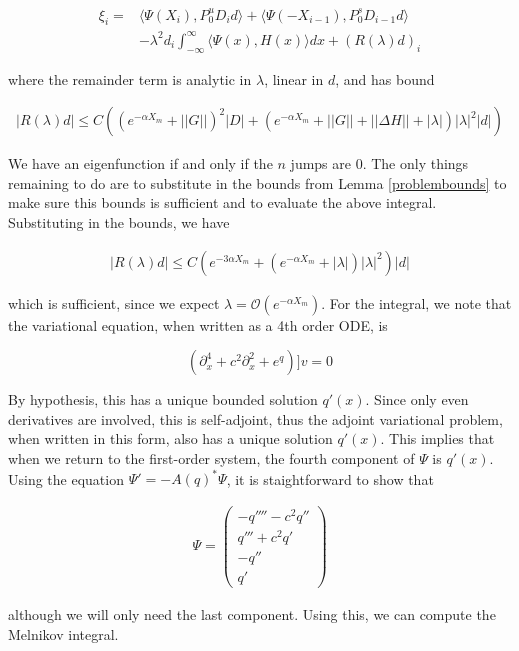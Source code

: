 \documentclass[12pt]{article}
\begin{document}
\begin{align}
\xi_i = &\langle \Psi(X_i), P_0^u D_i d\rangle + \langle \Psi(-X_{i-1}), P_0^s D_{i-1} d\rangle \\
&- \lambda^2 d_i \int_{-\infty}^\infty \langle \Psi(x), H(x) \rangle dx + (R(\lambda)d)_i
\end{align}

where the remainder term is analytic in $\lambda$, linear in $d$, and has bound

\begin{align}
|R(\lambda)d| \leq C( ( e^{-\alpha X_m} + ||G||)^2 |D| 
+ (e^{-\alpha X_m} + ||G|| + ||\Delta H|| + |\lambda|)|\lambda|^2 |d| )
\end{align}

We have an eigenfunction if and only if the $n$ jumps are 0. The only things remaining to do are to substitute in the bounds from Lemma \ref{problembounds} to make sure this bounds is sufficient and to evaluate the above integral. Substituting in the bounds, we have

\begin{align}
|R(\lambda)d| \leq C( e^{-3 \alpha X_m} + ( e^{-\alpha X_m} + |\lambda|)|\lambda|^2 )|d|
\end{align}

which is sufficient, since we expect $\lambda = \mathcal{O}(e^{-\alpha X_m})$. For the integral, we note that the variational equation, when written as a 4th order ODE, is

\[
(\partial_x^4 + c^2 \partial_x^2 + e^{q})]v = 0
\]

By hypothesis, this has a unique bounded solution $q'(x)$. Since only even derivatives are involved, this is self-adjoint, thus the adjoint variational problem, when written in this form, also has a unique solution $q'(x)$. This implies that when we return to the first-order system, the fourth component of $\Psi$ is $q'(x)$. Using the equation $\Psi' = -A(q)^* \Psi$, it is staightforward to show that

\begin{align*}
\Psi = \begin{pmatrix}
-q'''' - c^2 q''\\
q''' + c^2 q'\\
-q''\\
q'
\end{pmatrix}
\end{align*}

although we will only need the last component. Using this, we can compute the Melnikov integral.
\end{document}
